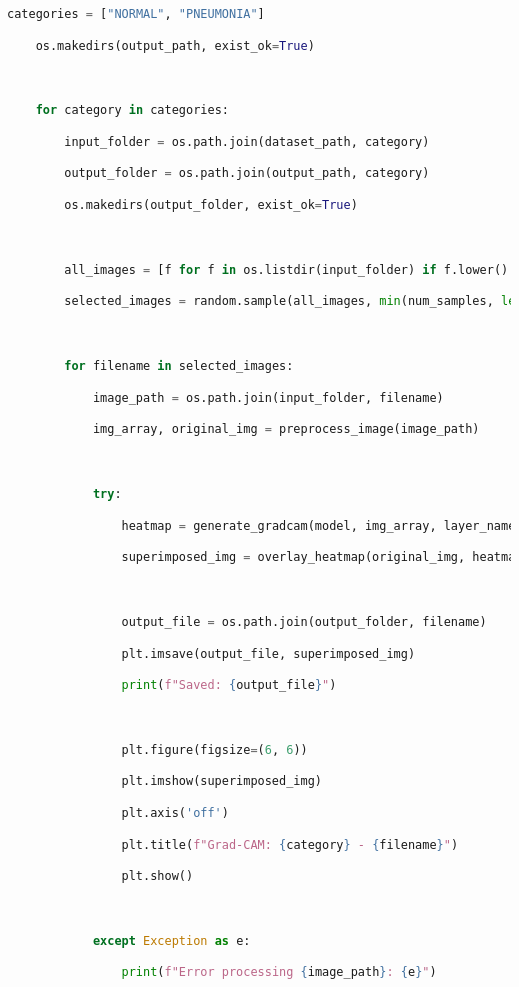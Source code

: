 \documentclass{article}
\begin{document}
\begin{lstlisting}[style=mystyle,language=Python]
    categories = ["NORMAL", "PNEUMONIA"]

    os.makedirs(output_path, exist_ok=True)



    for category in categories:

        input_folder = os.path.join(dataset_path, category)

        output_folder = os.path.join(output_path, category)

        os.makedirs(output_folder, exist_ok=True)



        all_images = [f for f in os.listdir(input_folder) if f.lower().endswith(('.jpg', '.jpeg', '.png'))]

        selected_images = random.sample(all_images, min(num_samples, len(all_images)))  # Avoid index errors



        for filename in selected_images:

            image_path = os.path.join(input_folder, filename)

            img_array, original_img = preprocess_image(image_path)



            try:

                heatmap = generate_gradcam(model, img_array, layer_name)

                superimposed_img = overlay_heatmap(original_img, heatmap)



                output_file = os.path.join(output_folder, filename)

                plt.imsave(output_file, superimposed_img)

                print(f"Saved: {output_file}")



                plt.figure(figsize=(6, 6))

                plt.imshow(superimposed_img)

                plt.axis('off')

                plt.title(f"Grad-CAM: {category} - {filename}")

                plt.show()



            except Exception as e:

                print(f"Error processing {image_path}: {e}")




\end{lstlisting}
\end{document}
